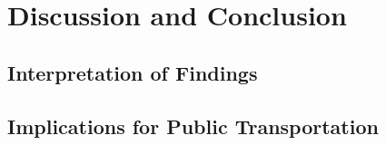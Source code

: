 \chapter{Discussion and Conclusion}
\label{cha:Conclusion}

\section{Interpretation of Findings}

\section{Implications for Public Transportation}